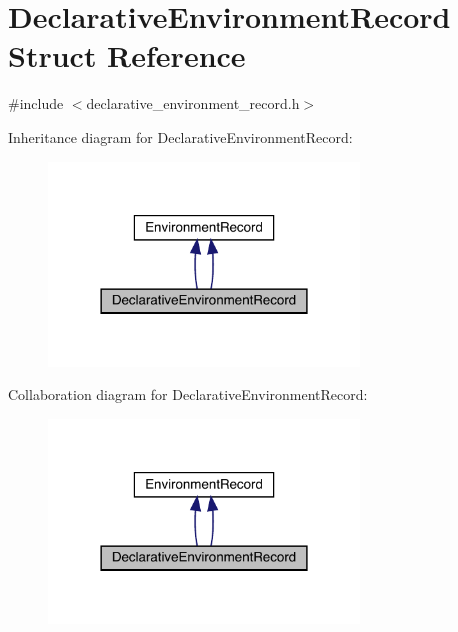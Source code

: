 \hypertarget{struct_declarative_environment_record}{}\section{Declarative\+Environment\+Record Struct Reference}
\label{struct_declarative_environment_record}


{\ttfamily \#include $<$declarative\+\_\+environment\+\_\+record.\+h$>$}



Inheritance diagram for Declarative\+Environment\+Record\+:
\nopagebreak
\begin{figure}[H]
\begin{center}
\leavevmode
\includegraphics[width=234pt]{struct_declarative_environment_record__inherit__graph}
\end{center}
\end{figure}


Collaboration diagram for Declarative\+Environment\+Record\+:
\nopagebreak
\begin{figure}[H]
\begin{center}
\leavevmode
\includegraphics[width=234pt]{struct_declarative_environment_record__coll__graph}
\end{center}
\end{figure}
